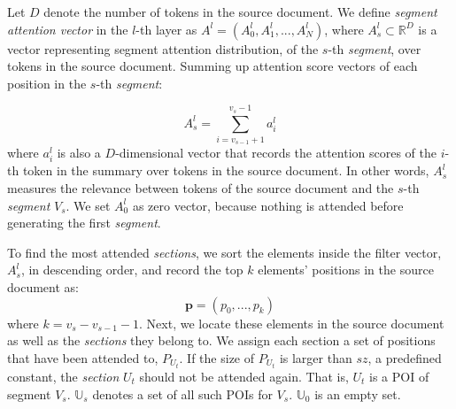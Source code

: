 Let $D$ denote the number of tokens in the source document.
We define \textit{segment attention vector} in the $l$-th layer as 
$A^{l} = (A_{0}^{l}, A_{1}^{l},..., A_{N}^{l})$, 
where $A_s^l\subset \mathbb{R}^{D}$ is a vector representing 
segment attention distribution, of the $s$-th \textit{segment},
over tokens in the source document. Summing up attention score vectors 
of each position in the $s$-th \textit{segment}:

\begin{equation}
    A_{s}^{l} = \sum_{i=v_{s-1}+1}^{v_{s}-1}a_{i}^{l}
\end{equation}
where $a_i^l$ is also a $D$-dimensional vector that records 
the attention scores of the $i$-th token in the summary over 
tokens in the source document. In other words, $ A_{s}^{l}$ 
measures the relevance between tokens of the source document and 
the $s$-th \textit{segment} $V_s$. 
We set $A_{0}^{l}$ as zero vector, because nothing is attended before generating 
the first \textit{segment}. 


To find the most attended \textit{sections}, 
we sort the elements inside the filter vector, 
$A_{s}^{l}$, in descending order, 
and record the top $k$ elements' positions in 
the source document as: 
\begin{equation}
    \mathbf{p}=(p_{0},...,p_{k})
\end{equation}
where $k=v_{s}-v_{s-1}-1$.
Next, we locate these elements in the source document as well as
the \textit{sections} they belong to. 
We assign each section a set of positions that have been attended to, 
$P_{U_{t}}$. 
If the size of $P_{U_{t}}$ is larger than
$sz$, a predefined constant,
the \textit{section} $U_{t}$ should not be attended again. 
That is, $U_{t}$ is a POI of segment $V_{s}$.
$\mathbb{U}_{s}$ denotes a set of all such POIs for $V_s$.
$\mathbb{U}_{0}$ is an empty set.


